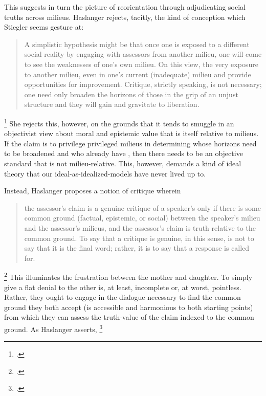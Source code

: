 \documentclass[letterpaper,notitlepage,12pt]{article}
\begin{document}
This suggests in turn the picture of reorientation through adjudicating social
truths across milieus. Haslanger rejects, tacitly, the kind of conception which
Stiegler seems gesture at: \blockquote{A simplistic hypothesis might be that once
  one is exposed to a different social reality by engaging with assessors from
  another milieu, one will come to see the weaknesses of one's own milieu. On
  this view, the very exposure to another milieu, even in one's current
  (inadequate) milieu and provide opportunities for improvement. Critique,
  strictly speaking, is not necessary; one need only broaden the horizons of
  those in the grip of an unjust structure and they will gain
 and gravitate to liberation.}\footcite[p.
81]{haslanger_but_2007}
She rejects this, however, on the grounds that it tends to smuggle in an
objectivist view about moral and epistemic value that is itself relative to
milieus.
If the claim is to privilege privileged milieus in determining whose horizons
need to be broadened and who already have , then there
needs to be an objective standard that is not milieu-relative.
This, however, demands a kind of ideal theory that our ideal-as-idealized-models
have never lived up to.

Instead, Haslanger proposes a notion of critique wherein \blockquote{the
  assessor's claim is a genuine critique of a speaker's only if there is some
  common ground (factual, epistemic, or social) between the speaker's milieu and
  the assessor's milieus, and the assessor's claim is truth relative to the
  common ground. To say that a critique is genuine, in this sense, is not to say
  that it is the final word; rather, it is to say that a response is called
for.}\footcite[p. 87]{haslanger_but_2007}
This illuminates the frustration between the mother and daughter.
To simply give a flat denial to the other is, at least, incomplete or, at worst,
pointless.
Rather, they ought to engage in the dialogue necessary to find the common ground
they both accept (is accessible and harmonious to both starting points) from
which they can assess the truth-value of the claim indexed to the common ground.
As Haslanger asserts, \footcite[p. 87]{haslanger_but_2007}
\end{document}
